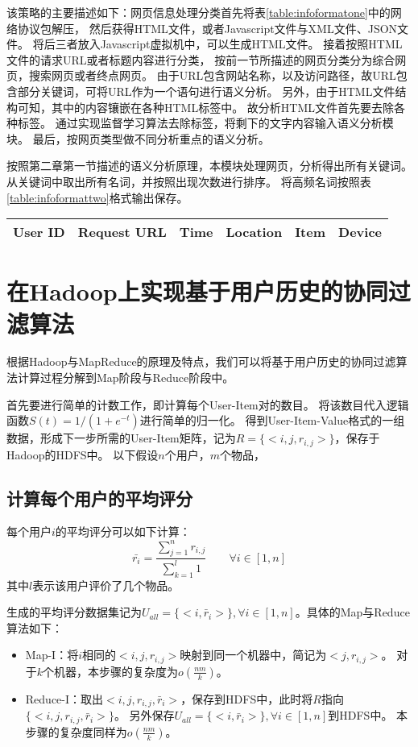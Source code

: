 该策略的主要描述如下：网页信息处理分类首先将表\ref{table:infoformatone}中的网络协议包解压，
然后获得HTML文件，或者Javascript文件与XML文件、JSON文件。
将后三者放入Javascript虚拟机中，可以生成HTML文件。
接着按照HTML文件的请求URL或者标题内容进行分类，
按前一节所描述的网页分类分为综合网页，搜索网页或者终点网页。
由于URL包含网站名称，以及访问路径，故URL包含部分关键词，可将URL作为一个语句进行语义分析。
另外，由于HTML文件结构可知，其中的内容镶嵌在各种HTML标签中。
故分析HTML文件首先要去除各种标签。
通过实现监督学习算法\parencite{Kohlsch2010Boilerplate}去除标签，将剩下的文字内容输入语义分析模块。
最后，按网页类型做不同分析重点的语义分析。

按照第二章第一节描述的语义分析原理，本模块处理网页，分析得出所有关键词。
从关键词中取出所有名词，并按照出现次数进行排序。
将高频名词按照表\ref{table:infoformattwo}格式输出保存。
\begin{center}
\label{table:infoformattwo}
\begin{tabular}{c|c|c|c|c|c}
	\hline
	User ID & Request URL & Time & Location & Item & Device \\
	\hline
\end{tabular}
\end{center}

\section{在Hadoop上实现基于用户历史的协同过滤算法}
根据Hadoop与MapReduce的原理及特点，我们可以将基于用户历史的协同过滤算法计算过程分解到Map阶段与Reduce阶段中。

首先要进行简单的计数工作，即计算每个User-Item对的数目。
将该数目代入逻辑函数$S(t)=1/(1+e^{-t})$进行简单的归一化。
得到User-Item-Value格式的一组数据，形成下一步所需的User-Item矩阵，记为$R=\{<i,j,r_{i,j}>\}$，保存于Hadoop的HDFS中。
以下假设$n$个用户，$m$个物品，

\subsection{计算每个用户的平均评分}
每个用户$i$的平均评分可以如下计算：
\begin{equation}
\bar{r_i} = \frac{\sum_{j=1}^n r_{i,j}}{\sum_{k=1}^l 1}\qquad \forall i\in [1,n]
\end{equation}
其中$l$表示该用户评价了几个物品。

生成的平均评分数据集记为$U_{all}=\{<i,\bar{r}_i>\},\forall i\in [1,n]$。具体的Map与Reduce算法如下：
\begin{itemize}
\item Map-I：将$i$相同的$<i,j,r_{i,j}>$映射到同一个机器中，简记为$<j,r_{i,j}>$。
对于$k$个机器，本步骤的复杂度为$o(\frac{nm}{k})$。
\item Reduce-I：取出$<i,j,r_{i,j},\bar{r}_i>$，保存到HDFS中，此时将$R$指向$\{<i,j,r_{i,j},\bar{r}_i>\}$。
另外保存$U_{all}=\{<i,\bar{r}_i>\},\forall i\in [1,n]$到HDFS中。
本步骤的复杂度同样为$o(\frac{nm}{k})$。
\end{itemize}

